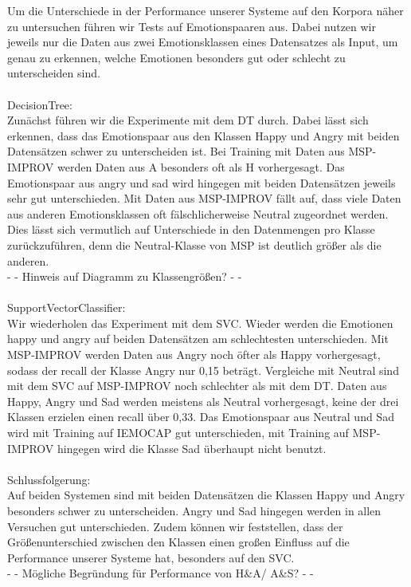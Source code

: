 \documentclass{article} %
\begin{document}
Um die Unterschiede in der Performance unserer Systeme auf den Korpora näher zu untersuchen führen wir Tests auf Emotionspaaren aus. Dabei nutzen wir jeweils nur die Daten aus zwei Emotionsklassen eines Datensatzes als Input, um genau zu erkennen, welche Emotionen besonders gut oder schlecht zu unterscheiden sind. \\ \\
DecisionTree: \\
Zunächst führen wir die Experimente mit dem DT durch.
Dabei lässt sich erkennen, dass das Emotionspaar aus den Klassen Happy und Angry mit beiden Datensätzen schwer zu unterscheiden ist. Bei Training mit Daten aus MSP-IMPROV werden Daten aus A besonders oft als H vorhergesagt.
Das Emotionspaar aus angry und sad wird hingegen mit beiden Datensätzen jeweils sehr gut unterschieden.
Mit Daten aus MSP-IMPROV fällt auf, dass viele Daten aus anderen Emotionsklassen oft fälschlicherweise Neutral zugeordnet werden. Dies lässt sich vermutlich auf Unterschiede in den Datenmengen pro Klasse zurückzuführen, denn die Neutral-Klasse von MSP ist deutlich größer als die anderen. \\
- - Hinweis auf Diagramm zu Klassengrößen? - - \\ \\
SupportVectorClassifier: \\
Wir wiederholen das Experiment mit dem SVC.
Wieder werden die Emotionen happy und angry auf beiden Datensätzen am schlechtesten unterschieden. Mit MSP-IMPROV werden Daten aus Angry noch öfter als Happy vorhergesagt, sodass der recall der Klasse Angry nur 0,15 beträgt.
Vergleiche mit Neutral sind mit dem SVC auf MSP-IMPROV noch schlechter als mit dem DT. Daten aus Happy, Angry und Sad werden meistens als Neutral vorhergesagt, keine der drei Klassen erzielen einen recall über 0,33.
Das Emotionspaar aus Neutral und Sad wird mit Training auf IEMOCAP gut unterschieden, mit Training auf MSP-IMPROV hingegen wird die Klasse Sad überhaupt nicht benutzt. \\ \\
Schlussfolgerung: \\
Auf beiden Systemen sind mit beiden Datensätzen die Klassen Happy und Angry besonders schwer zu unterscheiden. Angry und Sad hingegen werden in allen Versuchen gut unterschieden. Zudem können wir feststellen, dass der Größenunterschied zwischen den Klassen einen großen Einfluss auf die Performance unserer Systeme hat, besonders auf den SVC. \\
- - Mögliche Begründung für Performance von H\&A/ A\&S? - - \\ \\
\end{document}
